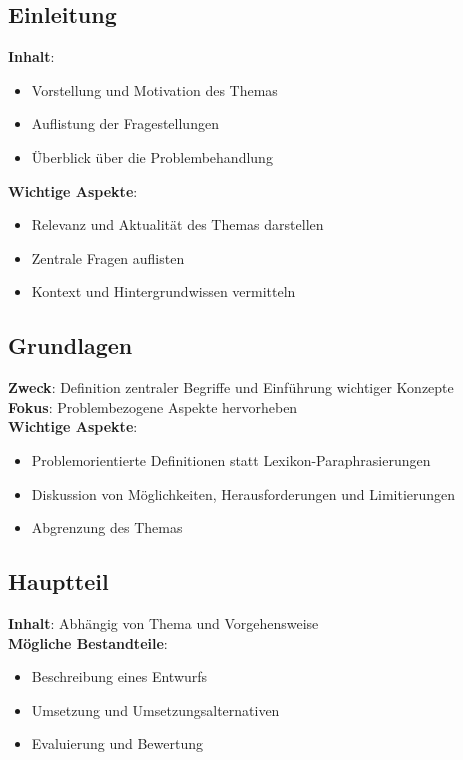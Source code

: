 \documentclass[12pt,a4paper,oneside]{article}
\begin{document}
\subsection{Einleitung}
\textbf{Inhalt}:
\begin{itemize}
    \item Vorstellung und Motivation des Themas
    \item Auflistung der Fragestellungen
    \item Überblick über die Problembehandlung
\end{itemize}
\textbf{Wichtige Aspekte}:
\begin{itemize}
    \item Relevanz und Aktualität des Themas darstellen
    \item Zentrale Fragen auflisten
    \item Kontext und Hintergrundwissen vermitteln
\end{itemize}

\subsection{Grundlagen}
\textbf{Zweck}: Definition zentraler Begriffe und Einführung wichtiger Konzepte\\
\textbf{Fokus}: Problembezogene Aspekte hervorheben\\
\textbf{Wichtige Aspekte}:
\begin{itemize}
    \item Problemorientierte Definitionen statt Lexikon-Paraphrasierungen
    \item Diskussion von Möglichkeiten, Herausforderungen und Limitierungen
    \item Abgrenzung des Themas
\end{itemize}

\subsection{Hauptteil}
\textbf{Inhalt}: Abhängig von Thema und Vorgehensweise\\
\textbf{Mögliche Bestandteile}:
\begin{itemize}
    \item Beschreibung eines Entwurfs
    \item Umsetzung und Umsetzungsalternativen
    \item Evaluierung und Bewertung
\end{itemize}
\end{document}
